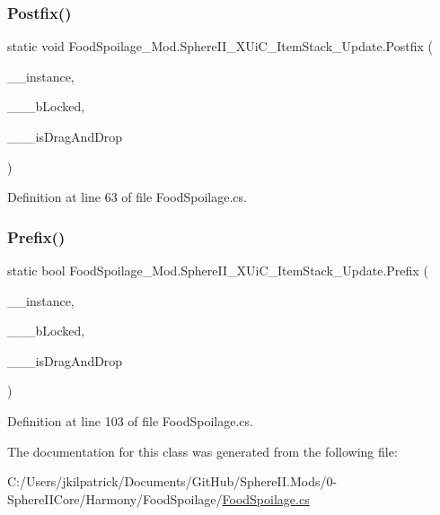 \subsubsection{\texorpdfstring{Postfix()}{Postfix()}}
{\footnotesize\ttfamily static void Food\+Spoilage\+\_\+\+Mod.\+Sphere\+I\+I\+\_\+\+X\+Ui\+C\+\_\+\+Item\+Stack\+\_\+\+Update.\+Postfix (\begin{DoxyParamCaption}\item[{X\+Ui\+C\+\_\+\+Item\+Stack}]{\+\_\+\+\_\+instance,  }\item[{bool}]{\+\_\+\+\_\+\+\_\+b\+Locked,  }\item[{bool}]{\+\_\+\+\_\+\+\_\+is\+Drag\+And\+Drop }\end{DoxyParamCaption})\hspace{0.3cm}{\ttfamily [static]}}



Definition at line 63 of file Food\+Spoilage.\+cs.

\mbox{\label{class_food_spoilage___mod_1_1_sphere_i_i___x_ui_c___item_stack___update_abc543c92273c34f9628f696abad49c84}} 
\subsubsection{\texorpdfstring{Prefix()}{Prefix()}}
{\footnotesize\ttfamily static bool Food\+Spoilage\+\_\+\+Mod.\+Sphere\+I\+I\+\_\+\+X\+Ui\+C\+\_\+\+Item\+Stack\+\_\+\+Update.\+Prefix (\begin{DoxyParamCaption}\item[{X\+Ui\+C\+\_\+\+Item\+Stack}]{\+\_\+\+\_\+instance,  }\item[{bool}]{\+\_\+\+\_\+\+\_\+b\+Locked,  }\item[{bool}]{\+\_\+\+\_\+\+\_\+is\+Drag\+And\+Drop }\end{DoxyParamCaption})\hspace{0.3cm}{\ttfamily [static]}}



Definition at line 103 of file Food\+Spoilage.\+cs.



The documentation for this class was generated from the following file\+:\begin{DoxyCompactItemize}
\item 
C\+:/\+Users/jkilpatrick/\+Documents/\+Git\+Hub/\+Sphere\+I\+I.\+Mods/0-\/\+Sphere\+I\+I\+Core/\+Harmony/\+Food\+Spoilage/\mbox{\hyperlink{_food_spoilage_8cs}{Food\+Spoilage.\+cs}}\end{DoxyCompactItemize}

